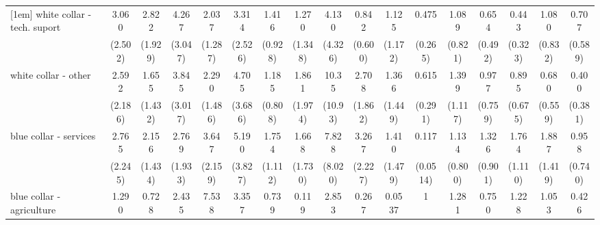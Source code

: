 {\begin{tabular}{l*{16}{c}}
[1em]
white collar - tech. suport&       3.060         &       2.822         &       4.267\sym{*}  &       2.037         &       3.314         &       1.416         &       1.270         &       4.130         &       0.842         &       1.125         &       0.475         &       1.089         &       0.654         &       0.443         &       1.080         &       0.707         \\
                    &     (2.502)         &     (1.929)         &     (3.047)         &     (1.287)         &     (2.526)         &     (0.928)         &     (1.348)         &     (4.326)         &     (0.600)         &     (1.172)         &     (0.265)         &     (0.821)         &     (0.492)         &     (0.323)         &     (0.832)         &     (0.589)         \\
[1em]
white collar - other&       2.592         &       1.655         &       3.845         &       2.290         &       4.705\sym{*}  &       1.185         &       1.861         &       10.35\sym{*}  &       2.708         &       1.366         &       0.615         &       1.399         &       0.977         &       0.895         &       0.680         &       0.400         \\
                    &     (2.186)         &     (1.432)         &     (3.017)         &     (1.486)         &     (3.686)         &     (0.808)         &     (1.974)         &     (10.93)         &     (1.862)         &     (1.449)         &     (0.291)         &     (1.117)         &     (0.759)         &     (0.675)         &     (0.559)         &     (0.381)         \\
[1em]
blue collar - services&       2.765         &       2.156         &       2.769         &       3.647\sym{*}  &       5.190\sym{*}  &       1.754         &       1.668         &       7.828\sym{*}  &       3.267         &       1.410         &       0.117\sym{***}&       1.134         &       1.326         &       1.764         &       1.887         &       0.958         \\
                    &     (2.245)         &     (1.434)         &     (1.933)         &     (2.159)         &     (3.827)         &     (1.112)         &     (1.730)         &     (8.020)         &     (2.227)         &     (1.479)         &    (0.0514)         &     (0.800)         &     (0.901)         &     (1.110)         &     (1.419)         &     (0.740)         \\
[1em]
blue collar - agriculture&       1.290         &       0.728         &       2.435         &       7.538\sym{**} &       3.357         &       0.739         &       0.119         &       2.853         &       0.267         &      0.0537\sym{*}  &           1         &       1.281         &       0.750         &       1.228         &       1.053         &       0.426         \\

\end{tabular}}
